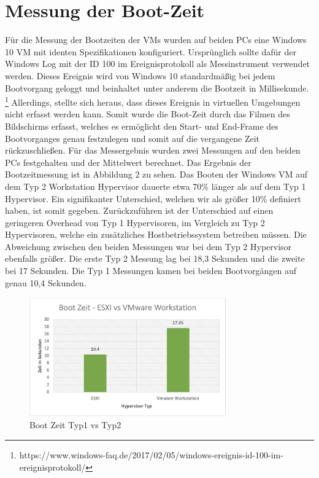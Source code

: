 \documentclass[conference]{IEEEtran}
\begin{document}
\section{Messung der Boot-Zeit}
\label{Messung der CPU Performance}
Für die Messung der Bootzeiten der VMs wurden auf beiden PCs eine Windows 10 VM mit identen Spezifikationen konfiguriert. Ursprünglich sollte dafür der Windows Log mit der ID 100 im Ereignisprotokoll als Messinstrument verwendet werden. Dieses Ereignis wird von Windows 10 standardmäßig bei jedem Bootvorgang geloggt und beinhaltet unter anderem die Bootzeit in Millisekunde. \footnote{https://www.windows-faq.de/2017/02/05/windows-ereignis-id-100-im-ereignisprotokoll/} Allerdings, stellte sich heraus, dass dieses Ereignis in virtuellen Umgebungen nicht erfasst werden kann. Somit wurde die Boot-Zeit durch das Filmen des Bildschirms erfasst, welches es ermöglicht den Start- und End-Frame des Bootvorganges genau festzulegen und somit auf die vergangene Zeit rückzuschließen. Für das Messergebnis wurden zwei Messungen auf den beiden PCs festgehalten und der Mittelwert berechnet.
Das Ergebnis der Bootzeitmessung ist in Abbildung 2 zu sehen. Das Booten der Windows VM auf dem Typ 2 Workstation Hypervisor dauerte etwa 70\% länger als auf dem Typ 1 Hypervisor. Ein signifikanter Unterschied, welchen wir als größer 10\% definiert haben, ist somit gegeben. Zurückzuführen ist der Unterschied auf einen geringeren Overhead von Typ 1 Hypervisoren, im Vergleich zu Typ 2 Hypervisoren, welche ein zusätzliches Hostbetriebssystem betreiben müssen. Die Abweichung zwischen den beiden Messungen war bei dem Typ 2 Hypervisor ebenfalls größer. Die erste Typ 2 Messung lag bei 18,3 Sekunden und die zweite bei 17 Sekunden. Die Typ 1 Messungen kamen bei beiden Bootvorgängen auf genau 10,4 Sekunden.

\begin{figure}[!h]
	\centering
	\includegraphics[keepaspectratio,width=8.5cm,height=0.75\textheight]{bootzeit.png}
	\caption{Boot Zeit Typ1 vs Typ2}
	\label{architecture}
\end{figure}
\end{document}
